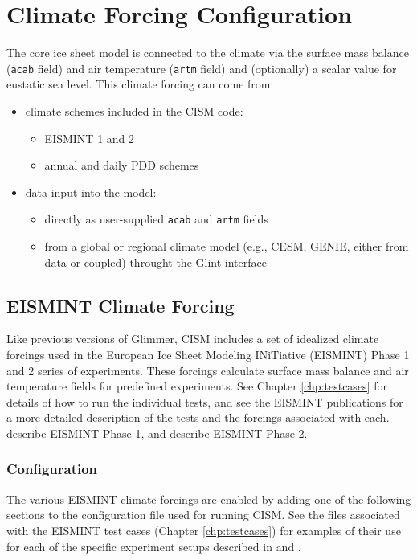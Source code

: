 \section{Climate Forcing Configuration}
The core ice sheet model is connected to the climate via the surface mass balance (\texttt{acab} field) 
and air temperature (\texttt{artm} field) and (optionally) a scalar value for eustatic sea level. 
This climate forcing can come from:
\begin{itemize}
  \item  climate schemes included in the CISM code:
    \begin{itemize}
      \item EISMINT 1 and 2
      \item annual and daily PDD schemes
    \end{itemize}

  \item  data input into the model:
    \begin{itemize}
      \item directly as user-supplied \texttt{acab} and \texttt{artm} fields
      \item from a global or regional climate model (e.g., CESM, GENIE, either from data or coupled) throught the Glint interface
    \end{itemize}
\end{itemize}



%
\subsection{EISMINT Climate Forcing}\label{driver:eismint}
Like previous versions of Glimmer, CISM includes a set of idealized climate forcings used in the 
European Ice Sheet Modeling INiTiative (EISMINT) Phase 1 and 2
series of experiments.  These forcings calculate surface mass balance and 
air temperature fields for predefined experiments.  See Chapter \ref{chp:testcases}
for details of how to run the individual tests, and see the EISMINT publications
for a more detailed description of the tests and the forcings associated with each.
\citet{Huybrechts1996} describe EISMINT Phase 1, and \citet{Payne2000} describe EISMINT Phase 2.

\subsubsection{Configuration}
The various EISMINT climate forcings are enabled by adding one of the following
sections to the configuration file used for running CISM.  See the files associated
with the EISMINT test cases (Chapter \ref{chp:testcases}) for examples of their use
for each of the specific experiment setups described in \citet{Huybrechts1996} and \citet{Payne2000}.

